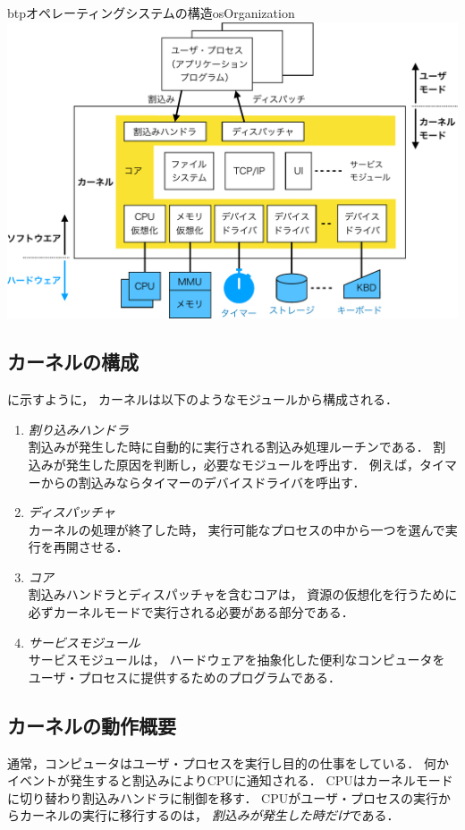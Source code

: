 \begin{myfig}{btp}{オペレーティングシステムの構造}{osOrganization}
  \includegraphics[scale=0.66]{Fig/osOrganization-crop.pdf}
\end{myfig}

\subsection{カーネルの構成}
に示すように，
カーネルは以下のようなモジュールから構成される．

\begin{enumerate}
\item \emph{割り込みハンドラ} \\
  割込みが発生した時に自動的に実行される割込み処理ルーチンである．
  割込みが発生した原因を判断し，必要なモジュールを呼出す．
  例えば，タイマーからの割込みならタイマーのデバイスドライバを呼出す．
\item \emph{ディスパッチャ} \\
  カーネルの処理が終了した時，
  実行可能なプロセスの中から一つを選んで実行を再開させる．
\item \emph{コア} \\
  割込みハンドラとディスパッチャを含むコアは，
  資源の仮想化を行うために必ずカーネルモードで実行される必要がある部分である．
\item \emph{サービスモジュール} \\
  サービスモジュールは，
  ハードウェアを抽象化した便利なコンピュータを
  ユーザ・プロセスに提供するためのプログラムである．
\end{enumerate}

\subsection{カーネルの動作概要}
通常，コンピュータはユーザ・プロセスを実行し目的の仕事をしている．
何かイベントが発生すると割込みによりCPUに通知される．
CPUはカーネルモードに切り替わり割込みハンドラに制御を移す．
CPUがユーザ・プロセスの実行からカーネルの実行に移行するのは，
\emph{割込みが発生した時だけ}である．

